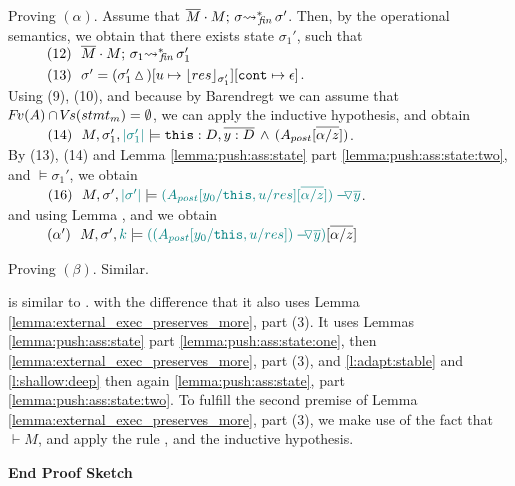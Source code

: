 {\begin{description}
 \vspace{.1cm}
Proving $(\alpha)$. Assume that   $\leadstoBoundedStarFin  {\Mtwo\cdot M}  {\sigma}  {\sigma'}$. Then, by the operational semantics, we obtain that 
there exists state $\sigma_1'$, such that \\
$\SPS (12) \ \ \leadstoBoundedStarFin  {\Mtwo\cdot M}  {\sigma_1}  {\sigma_1'}$ \\
$\SPS (13) \ \ \sigma'=(\sigma_1'\popSymbol)[u \mapsto {\interpret {\sigma_1'} {res}}][\prg{cont}\mapsto \epsilon]$.
\\
Using (9), (10), and because by Barendregt we can assume that $\fv(A)\cap \vs(stmt_m) = \emptyset$, we can apply the inductive hypothesis, and obtain\\
$\SPS (14) \ \  \satDAssertFrom M  {\sigma_1'} {\sdN{\DepthSt {\sigma_1'}}}    {\prg{this}:D,\overline{y:D}\, \wedge\, (A_{post}[\overline{\alpha/z}])}$.
\\
By (13), (14) and Lemma  \ref{lemma:push:ass:state} part \ref{lemma:push:ass:state:two}, and $\models \sigma_1'$, we obtain\\
$\SPS (16) \ \  \satDAssertFrom M  {\sigma'}  {\sdN{\DepthSt {\sigma'}}}  {\sdN {\PushAS y {(A_{post}[y_0/ \prg{this},u/res][\overline{\alpha/z}])}}}$.\\
 and using Lemma , and    we obtain \\
$\SPS (\alpha') \ \  \satDAssertFrom M  {\sigma'}  {\sdN{k}}  {\sdN {(\PushAS y {(A_{post}[y_0/ \prg{this},u/res])})}[\overline{\alpha/z}]}$

 \vspace{.1cm}
Proving $(\beta)$. Similar.

\item[{\sc{Call\_Ext\_Adapt}}] is similar to {}. with the difference that it also uses Lemma \ref{lemma:external_exec_preserves_more}, part (3).
 It uses  Lemmas
 \ref{lemma:push:ass:state} part \ref{lemma:push:ass:state:one}, then \ref{lemma:external_exec_preserves_more}, part (3),  and   \ref{l:adapt:stable} and \ref{l:shallow:deep}
 then again \ref{lemma:push:ass:state}, part \ref{lemma:push:ass:state:two}.
 To fulfill the second premise of Lemma  \ref{lemma:external_exec_preserves_more}, part (3), we make use of the fact that $\vdash M$, and apply the rule {}, and the inductive hypothesis.
\end{description}
\noindent
\vspace{.1cm}
  {\textbf{End Proof Sketch}} 

}
